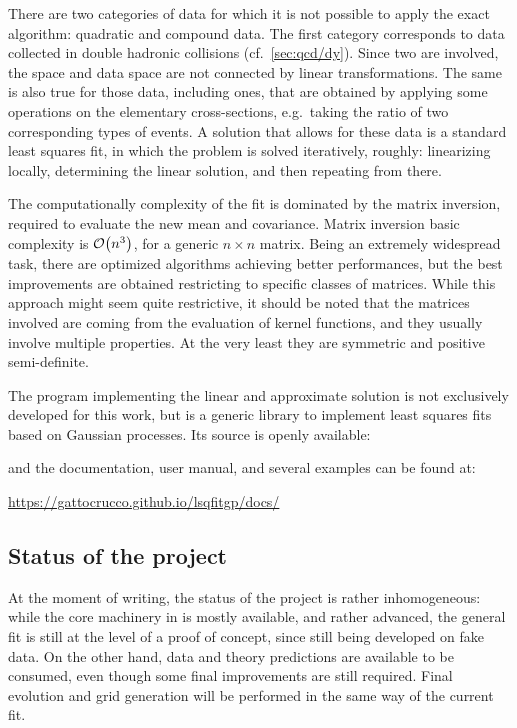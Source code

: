 There are two categories of data for which it is not possible to apply the
exact algorithm: quadratic and compound data.
%
The first category corresponds to data collected in double hadronic collisions
(cf.\ \cref{sec:qcd/dy}).
Since two \pdfs are involved, the \pdf space and data space are not connected
by linear transformations.
%
The same is also true for those data, including \dis ones, that are obtained by
applying some operations on the elementary cross-sections, e.g.\ taking the
ratio of two corresponding types of events.
%
A solution that allows for these data is a standard least squares fit, in which
the problem is solved iteratively, roughly: linearizing locally, determining
the linear solution, and then repeating from there.

The computationally complexity of the fit is dominated by the matrix inversion,
required to evaluate the new mean and covariance.
%
Matrix inversion basic complexity is $\order{n^3}$, for a generic $n \times n$
matrix.
Being an extremely widespread task, there are optimized algorithms achieving
better performances, but the best improvements are obtained restricting to
specific classes of matrices.
%
While this approach might seem quite restrictive, it should be noted that the
matrices involved are coming from the evaluation of kernel functions, and they
usually involve multiple properties. 
At the very least they are symmetric and positive semi-definite.

The program implementing the linear and approximate solution is not exclusively
developed for this work, but is a generic library to implement least squares
fits based on Gaussian processes.
Its source is openly available:
\begin{center}
\end{center}
and the documentation, user manual, and several examples can be found at:
\begin{center}
  \url{https://gattocrucco.github.io/lsqfitgp/docs/}
\end{center}

\subsection{Status of the project}
\label{sec:gp/status}

At the moment of writing, the status of the project is rather inhomogeneous:
while the core machinery in \lsqfitgp is mostly available, and rather advanced,
the general fit is still at the level of a proof of concept, since still being
developed on fake data.
%
On the other hand, data and theory predictions are available to be consumed,
even though some final improvements are still required.
%
Final evolution and grid generation will be performed in the same way of the
\nnpdf current fit.


